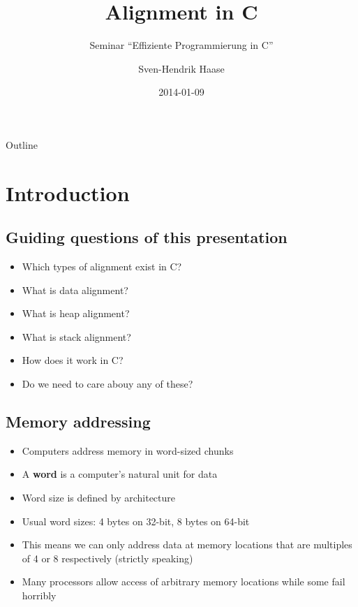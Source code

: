 \documentclass{beamer}
\begin{document}
\title{Alignment in C}
\subtitle{Seminar ``Effiziente Programmierung in C''}
\date{2014-01-09}
\author{Sven-Hendrik Haase}

\begin{frame}
    \titlepage
\end{frame}

\begin{frame}{Outline}
    \tiny
    \tableofcontents
\end{frame}

\section{Introduction}
\subsection{Guiding questions of this presentation}
\begin{frame}{\insertsection}{\insertsubsection}
	\begin{itemize}
		\item Which types of alignment exist in C?\pause
		\item What is data alignment?\pause
		\item What is heap alignment?\pause
		\item What is stack alignment?\pause
        \item How does it work in C?\pause
        \item Do we need to care abouy any of these?
	\end{itemize}
\end{frame}

\subsection{Memory addressing}
\begin{frame}{\insertsection}{\insertsubsection}
	\begin{itemize}
		\item Computers address memory in word-sized chunks\pause
		\item A \textbf{word} is a computer's natural unit for data
		\item Word size is defined by architecture
		\item Usual word sizes: 4 bytes on 32-bit, 8 bytes on 64-bit\pause
		\item This means we can only address data at memory locations that are
			  multiples of 4 or 8 respectively (strictly speaking)
        \item Many processors allow access of arbitrary memory locations while some fail
            horribly
	\end{itemize}
\end{frame}
\end{document}
